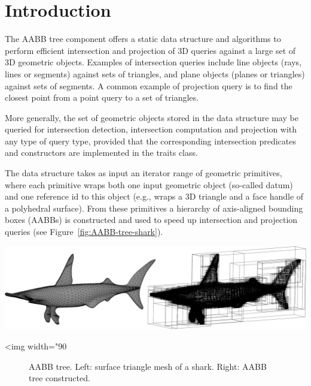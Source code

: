 \section{Introduction}
\label{AABB_tree_section_intro}

The AABB tree component offers a static data structure and algorithms to perform efficient intersection and projection of 3D queries against a large set of 3D geometric objects. Examples of intersection queries include line objects (rays, lines or segments) against sets of triangles, and plane objects (planes or triangles) against sets of segments. A common example of projection query is to find the closest point from a point query to a set of triangles.

More generally, the set of geometric objects stored in the data structure may be queried for intersection detection, intersection computation and projection with any type of query type, provided that the corresponding intersection predicates and constructors are implemented in the traits class. 

The data structure takes as input an iterator range of geometric primitives, where each primitive wraps both one input geometric object (so-called datum) and one reference id to this object (e.g., wraps a 3D triangle and a face handle of a polyhedral surface). From these primitives a hierarchy of axis-aligned bounding boxes (AABBs) is constructed and used to speed up intersection and projection queries (see Figure~\ref{fig:AABB-tree-shark}). 

\begin{center}
    \label{fig:AABB-tree-shark}
    \begin{ccTexOnly}
      \includegraphics[width=1.0\textwidth]{AABB_tree/shark}
    \end{ccTexOnly}
    \begin{ccHtmlOnly}
        <img width="90%
    \end{ccHtmlOnly}
    \begin{figure}[h]
        \caption{AABB tree.
                 Left: surface triangle mesh of a shark.
                 Right: AABB tree constructed.}
    \end{figure}
\end{center}
